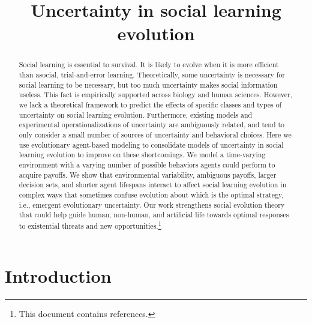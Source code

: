 \documentclass[letterpaper,11.5pt]{scrartcl}
\title{Uncertainty in social learning evolution}
\author{{}}
\begin{document}
\maketitle

\newcommand{\pisub}[1]{\pi_{\mathrm{#1}}}
\newcommand{\pilow}{\pisub{low}}
\newcommand{\pihigh}{\pisub{high}}
\newcommand{\piI}{\langle \pisub{I} \rangle}
\newcommand{\piS}{\langle \pisub{S} \rangle}

\newcommand{\meanvar}[1]{\langle #1 \rangle}
\newcommand{\meansl}{\meanvar{s}}
\newcommand{\meanpi}{\meanvar{\pi}}
\newcommand{\meansoc}{\meanvar{\pi_\mathrm{S}}}
\newcommand{\meanasoc}{\meanvar{\pi_\mathrm{A}}}
\newcommand{\meanT}{\meanvar{T}}

\begin{abstract}

Social learning is essential to survival. It is likely to evolve when it is more
efficient than asocial, trial-and-error learning. Theoretically, some uncertainty is
necessary for social learning to be necessary, but too much uncertainty makes
social information useless. This fact is empirically
supported across biology and human sciences. However, we lack a theoretical
framework to predict the effects of specific classes and types of uncertainty on social
learning evolution. Furthermore, existing models and experimental operationalizations of
uncertainty are ambiguously related, and 
tend to only consider a small number of sources of uncertainty and behavioral
choices.  Here we use evolutionary agent-based modeling to consolidate
models of uncertainty in social learning evolution to improve on these
shortcomings. We model a time-varying environment with a varying number
of possible behaviors agents could perform to acquire payoffs.
We show that environmental variability, ambiguous payoffs, 
larger decision sets, and shorter agent lifespans interact to 
affect social learning evolution in complex ways that 
sometimes confuse evolution about which is the optimal strategy, i.e., 
emergent evolutionary uncertainty. 
Our work strengthens social evolution theory that could help 
guide human, non-human, and artificial life towards optimal responses to existential
threats and new opportunities.\footnote{This document contains
 references.}  
\end{abstract}

\section{Introduction}
\end{document}
